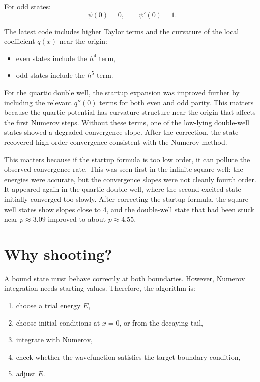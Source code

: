 \documentclass[11pt]{article}
\begin{document}
    For odd states:
    \begin{equation}
        \psi(0)=0, \qquad \psi'(0)=1.
    \end{equation}

    The latest code includes higher Taylor terms and the curvature of the local coefficient $q(x)$ near the origin:
    \begin{itemize}
        \item even states include the $h^4$ term,
        \item odd states include the $h^5$ term.
    \end{itemize}

    For the quartic double well, the startup expansion was improved further by including the relevant $q''(0)$ terms for both even and odd parity. This matters because the quartic potential has curvature structure near the origin that affects the first Numerov steps. Without these terms, one of the low-lying double-well states showed a degraded convergence slope. After the correction, the state recovered high-order convergence consistent with the Numerov method.

    This matters because if the startup formula is too low order, it can pollute the observed convergence rate. This was seen first in the infinite square well: the energies were accurate, but the convergence slopes were not cleanly fourth order. It appeared again in the quartic double well, where the second excited state initially converged too slowly. After correcting the startup formula, the square-well states show slopes close to 4, and the double-well state that had been stuck near $p\approx3.09$ improved to about $p\approx4.55$.

    \section{Why shooting?}

    A bound state must behave correctly at both boundaries. However, Numerov integration needs starting values. Therefore, the algorithm is:
    \begin{enumerate}
        \item choose a trial energy $E$,
        \item choose initial conditions at $x=0$, or from the decaying tail,
        \item integrate with Numerov,
        \item check whether the wavefunction satisfies the target boundary condition,
        \item adjust $E$.
    \end{enumerate}
\end{document}
